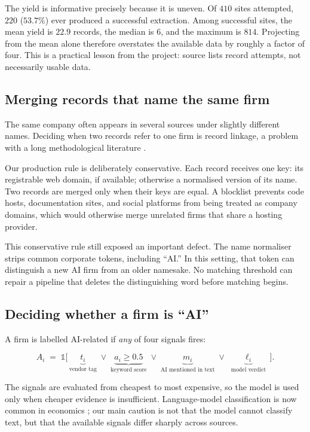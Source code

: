 \documentclass[11pt]{article}
\begin{document}
The yield is informative precisely because it is uneven. Of $410$ sites
attempted, $220$ ($53.7\%$) ever produced a successful extraction. Among
successful sites, the mean yield is $22.9$ records, the median is $6$, and the
maximum is $814$. Projecting from the mean alone therefore overstates the
available data by roughly a factor of four. This is a practical lesson from the
project: source lists record attempts, not necessarily usable data.

\subsection{Merging records that name the same firm}

The same company often appears in several sources under slightly different
names. Deciding when two records refer to one firm is record linkage, a problem
with a long methodological literature \citep{abramitzky2021linking}.

Our production rule is deliberately conservative. Each record receives one key:
its registrable web domain, if available; otherwise a normalised version of its
name. Two records are merged only when their keys are equal. A blocklist
prevents code hosts, documentation sites, and social platforms from being
treated as company domains, which would otherwise merge unrelated firms that
share a hosting provider.

This conservative rule still exposed an important defect. The name normaliser
strips common corporate tokens, including ``AI.'' In this setting, that token
can distinguish a new AI firm from an older namesake. No matching threshold can
repair a pipeline that deletes the distinguishing word before matching begins.

\subsection{Deciding whether a firm is ``AI''}

A firm is labelled AI-related if \emph{any} of four signals fires:

\begin{equation}
\label{eq:ai}
A_i \;=\; \mathbb{1}\big[\,
\underbrace{t_i}_{\text{vendor tag}} \;\vee\;
\underbrace{a_i \ge 0.5}_{\text{keyword score}} \;\vee\;
\underbrace{m_i}_{\text{AI mentioned in text}} \;\vee\;
\underbrace{\ell_i}_{\text{model verdict}}
\,\big].
\end{equation}

The signals are evaluated from cheapest to most expensive, so the model is used
only when cheaper evidence is insufficient. Language-model classification is
now common in economics \citep{dell2025deep}; our main caution is not that the
model cannot classify text, but that the available signals differ sharply
across sources.
\end{document}
